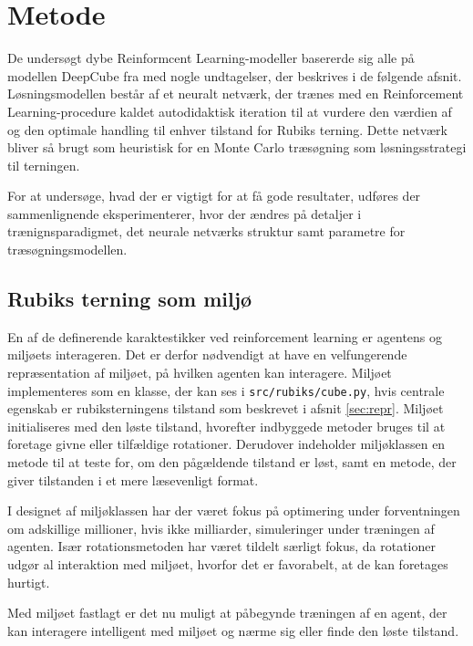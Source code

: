 \documentclass[../main.tex]{subfiles}
\begin{document}
\chapter{Metode}
De undersøgt dybe Reinformcent Learning-modeller basererde sig alle på modellen DeepCube fra \cite{HumansBeGone} med nogle undtagelser, der beskrives i de følgende afsnit.
Løsningsmodellen består af et neuralt netværk, der trænes med en Reinforcement Learning-procedure kaldet autodidaktisk iteration til at vurdere den værdien af og den optimale handling til enhver tilstand for Rubiks terning.
Dette netværk bliver så brugt som heuristisk for en Monte Carlo træsøgning som løsningsstrategi til terningen.

For at undersøge, hvad der er vigtigt for at få gode resultater, udføres der sammenlignende eksperimenterer, hvor der ændres på detaljer i trænignsparadigmet, det neurale netværks struktur samt parametre for træsøgningsmodellen.

\section{Rubiks terning som miljø}\label{sec:environment}
En af de definerende karaktestikker ved reinforcement learning er agentens og miljøets interageren.
Det er derfor nødvendigt at have en velfungerende repræsentation af miljøet, på hvilken agenten kan interagere.
Miljøet implementeres som en klasse, der kan ses i \texttt{src/rubiks/cube.py}, hvis centrale egenskab er rubiksterningens tilstand som beskrevet i afsnit \ref{sec:repr}.
Miljøet initialiseres med den løste tilstand, hvorefter indbyggede metoder bruges til at foretage givne eller tilfældige rotationer.
Derudover indeholder miljøklassen en metode til at teste for, om den pågældende tilstand er løst, samt en metode, der giver tilstanden i et mere læsevenligt format.

I designet af miljøklassen har der været fokus på optimering under forventningen om adskillige millioner, hvis ikke milliarder, simuleringer under træningen af agenten.
Især rotationsmetoden har været tildelt særligt fokus, da rotationer udgør al interaktion med miljøet, hvorfor det er favorabelt, at de kan foretages hurtigt.

Med miljøet fastlagt er det nu muligt at påbegynde træningen af en agent, der kan interagere intelligent med miljøet og nærme sig eller finde den løste tilstand.
\end{document}
